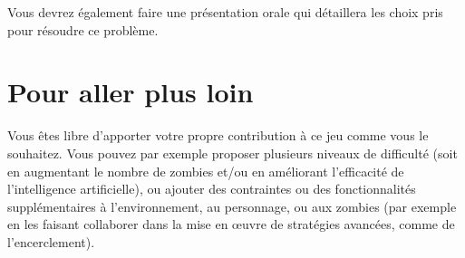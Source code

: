 \documentclass[a4paper,11pt]{article}
\begin{document}
Vous devrez également faire une présentation orale qui détaillera les choix pris pour résoudre ce problème.

\section{Pour aller plus loin}

Vous êtes libre d'apporter votre propre contribution à ce jeu comme vous le souhaitez. Vous pouvez par exemple proposer plusieurs niveaux de difficulté (soit en augmentant le nombre de zombies et/ou en améliorant l'efficacité de l'intelligence artificielle), ou ajouter des contraintes ou des fonctionnalités supplémentaires à l'environnement, au personnage, ou aux zombies (par exemple en les faisant collaborer dans la mise en \oe uvre de stratégies avancées, comme de l'encerclement).
\end{document}
